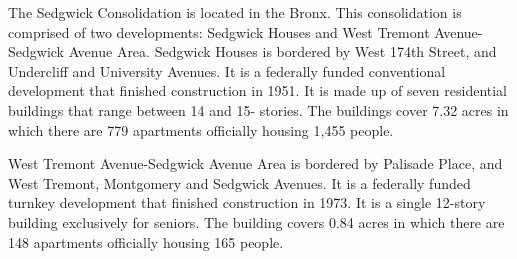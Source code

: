 The Sedgwick Consolidation is located in the Bronx. This consolidation is comprised of two developments: Sedgwick Houses and West Tremont Avenue-Sedgwick Avenue Area. Sedgwick Houses is bordered by West 174th Street, and Undercliff and University Avenues. It is a federally funded conventional development that finished construction in 1951. It is made up of seven residential buildings that range between 14 and 15- stories. The buildings cover 7.32 acres in which there are 779 apartments officially housing 1,455 people.   \par \vspace{.7\baselineskip}  \par \vspace{.7\baselineskip}West Tremont Avenue-Sedgwick Avenue Area is bordered by Palisade Place, and West Tremont, Montgomery and Sedgwick Avenues. It is a federally funded turnkey development that finished construction in 1973. It is a single 12-story building exclusively for seniors. The building covers 0.84 acres in which there are 148 apartments officially housing 165 people.